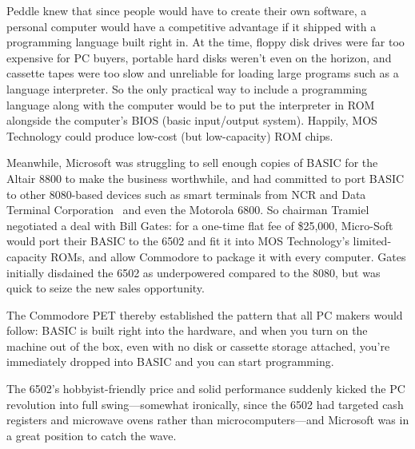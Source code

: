 Peddle knew that since people would have to create their own software, a
personal computer would have a competitive advantage if it shipped with
a programming language built right in.
At the time, floppy disk drives were far too expensive for PC buyers,
portable hard disks weren't even on the horizon, and cassette tapes were
too slow and unreliable for loading large programs such as a language interpreter.
So the only practical way to include a programming
language along with the computer would be to put the
interpreter in ROM alongside the computer's BIOS (basic input/output system).
Happily, MOS Technology could produce low-cost (but low-capacity) ROM chips.

Meanwhile, Microsoft was struggling to sell enough
copies of BASIC for the Altair 8800 to make the business worthwhile, and
had committed to port BASIC to other 8080-based devices such as smart
terminals from NCR and Data Terminal Corporation~\cite[p. 96]{gates} and
even the Motorola 6800.
So chairman Tramiel negotiated a deal with Bill Gates: for a
one-time flat fee of \$25,000, Micro-Soft would port their BASIC to
the 6502 and fit it into MOS Technology's limited-capacity ROMs,
and allow Commodore to package it with every computer.
Gates initially disdained the 6502 as underpowered compared to the 8080,
but was quick to seize the new sales opportunity.

The Commodore PET thereby established the pattern that all PC makers
would follow: BASIC is built right into the hardware, and when you turn
on the machine out of the box, even with no disk or cassette storage
attached, you're immediately dropped into BASIC and you can start
programming.

The 6502's hobbyist-friendly price and solid performance suddenly
kicked the PC revolution into full swing---somewhat ironically, since
the 6502 had targeted cash registers and microwave ovens rather than
microcomputers---and Microsoft was in a great position to catch the
wave.

